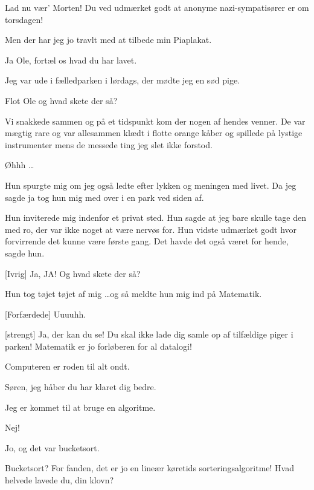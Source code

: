 \documentclass[a4paper,11pt]{article}
\begin{document}
\begin{sketch}
Lad nu vær' Morten! Du ved udmærket godt at anonyme
nazi-sympatisører er om torsdagen!

 Men der har jeg jo travlt med at tilbede min Piaplakat.


 Ja Ole, fortæl os hvad du har lavet.

 Jeg var ude i fælledparken i lørdags, der mødte jeg en sød
pige. 


 Flot Ole og hvad skete der så?

 Vi snakkede sammen og på et tidspunkt kom der nogen af
hendes venner. De var mægtig rare og var allesammen klædt i flotte
orange kåber og spillede på lystige instrumenter mens de messede ting
jeg slet ikke forstod.

 Øhhh \dots

 Hun spurgte mig om jeg også ledte efter lykken og meningen
med livet. Da jeg sagde ja tog hun mig med over i en park ved siden
af. 


 Hun inviterede mig indenfor et privat sted. Hun sagde at jeg
bare skulle tage den med ro, der var ikke noget at være nervøs
for. Hun vidste udmærket godt hvor forvirrende det kunne være første
gang. Det havde det også været for hende, sagde hun. 

[Ivrig] Ja, JA! Og hvad skete der så?

 Hun tog tøjet tøjet af mig \dots og så meldte hun mig ind på Matematik.

[Forfærdede] Uuuuhh.

[strengt] Ja, der kan du se! Du skal ikke lade dig samle op af
tilfældige piger i parken! Matematik er jo forløberen for al datalogi!

 Computeren er roden til alt ondt.

 Søren, jeg håber du har klaret dig bedre.


 Jeg er kommet til at bruge en algoritme.

 Nej!

 Jo, og det var bucketsort.

 Bucketsort? For fanden, det er jo en lineær køretids
sorteringsalgoritme! Hvad helvede lavede du, din klovn?


\end{sketch}
\end{document}
